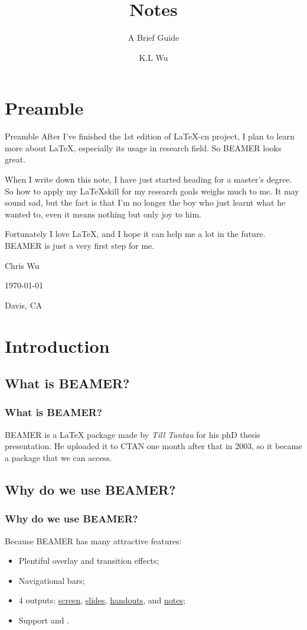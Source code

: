 \documentclass{beamer}
\title{\Beamer{} Notes}
\subtitle{A Brief Guide}
\author{K.L Wu}
\institute{From \LaTeX-beamer-en project on  {\color{cyan}wklchris-GitHub} \\
\url{https://github.com/wklchris/Note-by-LaTeX}}
\newcommand{\Beamer}{\textrm{BEAMER}}
\newcommand{\st}[1]{\uline{#1}}
\newcommand{\dpar}{\\ \mbox{}}
\begin{document}
\begin{frame}
  \titlepage
\end{frame}

\section*{Preamble}
\begin{frame}{Preamble}
After I've finished the 1st edition of \LaTeX-cn project, I plan to learn more about \LaTeX, especially its usage in research field. So \Beamer{} looks great.

When I write down this note, I have just started heading for a master's degree. So how to apply my \LaTeX skill for my research goals weighs much to me. It may sound sad, but the fact is that I'm no longer the boy who just learnt what he wanted to, even it means nothing but only joy to him. 

Fortunately I love \LaTeX, and I hope it can help me a lot in the future. \Beamer{} is just a very first step for me.

\vfill

\begin{flushright}

Chris Wu\dpar

\footnotesize\today

Davis, CA
\end{flushright}
\end{frame}

\section{Introduction}
\subsection{What is \protect\Beamer?}
\begin{frame}
  \frametitle{What is \protect\Beamer?}
  \Beamer{} is a \LaTeX{} package made by \textit{Till Tantau} for his phD thesis presentation. He uploaded it to CTAN one month after that in 2003, so it became a package that we can access.  
\end{frame}

\subsection{Why do we use \protect\Beamer?}
\begin{frame}
  \frametitle{Why do we use \Beamer?}
  Because \Beamer{} has many attractive features:
  \begin{itemize}
    \item Plentiful overlay and transition effects;
    \item Navigational bars;
    \item 4 outputs: \st{screen}, \st{slides}, \st{handouts}, and \st{notes};
    \item Support  and .
  \end{itemize}
\end{frame}
\end{document}
